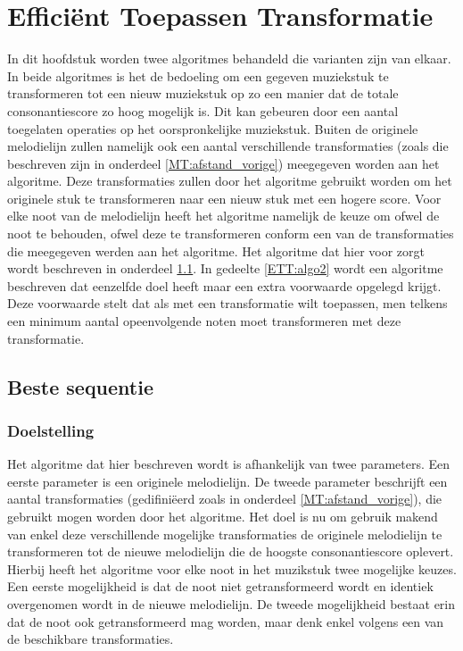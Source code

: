 \chapter{Effici\"ent Toepassen Transformatie}
\label{hoofdstuk:ETT}

In dit hoofdstuk worden twee algoritmes behandeld die varianten zijn van elkaar. In beide algoritmes is het de bedoeling om een gegeven muziekstuk te transformeren tot een nieuw muziekstuk op zo een manier dat de totale consonantiescore zo hoog mogelijk is. Dit kan gebeuren door een aantal toegelaten operaties op het oorspronkelijke muziekstuk. Buiten de originele melodielijn zullen namelijk ook een aantal verschillende transformaties (zoals die beschreven zijn in onderdeel \ref{MT:afstand_vorige}) meegegeven worden aan het algoritme. Deze transformaties zullen door het algoritme gebruikt worden om het originele stuk te transformeren naar een nieuw stuk met een hogere score. Voor elke noot van de melodielijn heeft het algoritme namelijk de keuze om ofwel de noot te behouden, ofwel deze te transformeren conform een van de transformaties die meegegeven werden aan het algoritme. Het algoritme dat hier voor zorgt wordt beschreven in onderdeel \ref{ETT:algo1}. In gedeelte \ref{ETT:algo2} wordt een algoritme beschreven dat eenzelfde doel heeft maar een extra voorwaarde opgelegd krijgt. Deze voorwaarde stelt dat als met een transformatie wilt toepassen, men telkens een minimum aantal opeenvolgende noten moet transformeren met deze transformatie. 

\section{Beste sequentie}
\label{ETT:algo1}

\subsection{Doelstelling}
Het algoritme dat hier beschreven wordt is afhankelijk van twee parameters. Een eerste parameter is een originele melodielijn. De tweede parameter beschrijft een aantal transformaties (gedifini\"eerd zoals in onderdeel \ref{MT:afstand_vorige}), die gebruikt mogen worden door het algoritme. Het doel is nu om gebruik makend van enkel deze verschillende mogelijke transformaties de originele melodielijn te transformeren tot de nieuwe melodielijn die de hoogste consonantiescore oplevert. Hierbij heeft het algoritme voor elke noot in het muzikstuk twee mogelijke keuzes. Een eerste mogelijkheid is dat de noot niet getransformeerd wordt en identiek overgenomen wordt in de nieuwe melodielijn. De tweede mogelijkheid bestaat erin dat de noot ook getransformeerd mag worden, maar denk enkel volgens een van de beschikbare transformaties.

